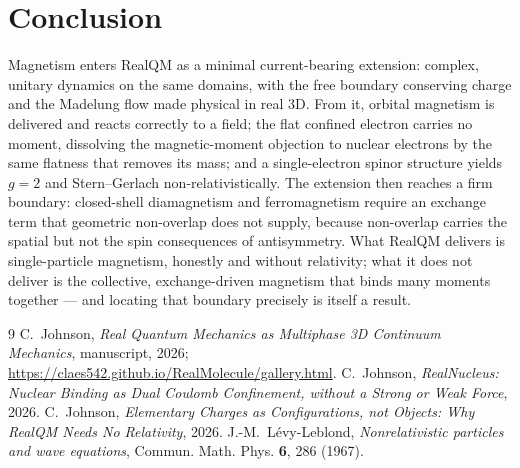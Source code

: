 \documentclass[11pt]{article}
\begin{document}
\section{Conclusion}
\label{sec:concl}

Magnetism enters RealQM as a minimal current-bearing extension: complex, unitary dynamics on the same
domains, with the free boundary conserving charge and the Madelung flow made physical in real 3D. From it,
orbital magnetism is delivered and reacts correctly to a field; the flat confined electron carries no
moment, dissolving the magnetic-moment objection to nuclear electrons by the same flatness that removes
its mass; and a single-electron spinor structure yields $g=2$ and Stern--Gerlach non-relativistically. The
extension then reaches a firm boundary: closed-shell diamagnetism and ferromagnetism require an exchange
term that geometric non-overlap does not supply, because non-overlap carries the spatial but not the spin
consequences of antisymmetry. What RealQM delivers is single-particle magnetism, honestly and without
relativity; what it does not deliver is the collective, exchange-driven magnetism that binds many moments
together --- and locating that boundary precisely is itself a result.

\begin{thebibliography}{9}
 C.~Johnson, \emph{Real Quantum Mechanics as Multiphase 3D Continuum Mechanics},
manuscript, 2026; \url{https://claes542.github.io/RealMolecule/gallery.html}.
 C.~Johnson, \emph{RealNucleus: Nuclear Binding as Dual Coulomb Confinement, without
a Strong or Weak Force}, 2026.
 C.~Johnson, \emph{Elementary Charges as Configurations, not Objects: Why RealQM Needs No
Relativity}, 2026.
 J.-M.~Lévy-Leblond, \emph{Nonrelativistic particles and wave equations},
Commun. Math. Phys. \textbf{6}, 286 (1967).
\end{thebibliography}
\end{document}
